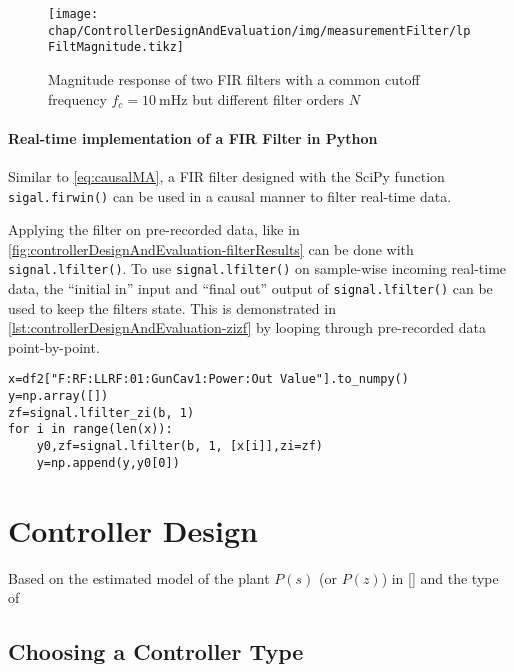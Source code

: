 \begin{figure}[tb]
	\centering
	\texttt{[image: chap/ControllerDesignAndEvaluation/img/measurementFilter/lpFiltMagnitude.tikz]}
	\caption{Magnitude response of two FIR filters with a common cutoff frequency $f_c=\SI{10}{\milli\hertz}$ but different filter orders $N$}
	\label{fig:controllerDesignAndEvaluation-magn}
\end{figure}

\FloatBarrier
\paragraph{Real-time implementation of a FIR Filter in Python}
Similar to \autoref{eq:causalMA}, a FIR filter designed with the SciPy function \texttt{sigal.firwin()} can be used in a causal manner to filter real-time data.

Applying the filter on pre-recorded data, like in \autoref{fig:controllerDesignAndEvaluation-filterResults} can be done with \texttt{signal.lfilter()}. To use \texttt{signal.lfilter()} on sample-wise incoming real-time data, the ``initial in'' input and ``final out'' output of \texttt{signal.lfilter()} can be used to keep the filters state. This is demonstrated in \autoref{lst:controllerDesignAndEvaluation-zizf} by looping through pre-recorded data point-by-point.

\begin{lstlisting}[style=python,caption = Demonstration of the \texttt{zi} and \texttt{zf} variables when using \texttt{signal.lfilter()}, label = lst:controllerDesignAndEvaluation-zizf]
x=df2["F:RF:LLRF:01:GunCav1:Power:Out Value"].to_numpy()
y=np.array([])
zf=signal.lfilter_zi(b, 1)
for i in range(len(x)):
    y0,zf=signal.lfilter(b, 1, [x[i]],zi=zf)
    y=np.append(y,y0[0])
\end{lstlisting}











\newpage
\section{Controller Design}
Based on the estimated model of the plant $P(s)$ (or $P(z)$) in \autoref{} and the type of 


\subsection{Choosing a Controller Type}
